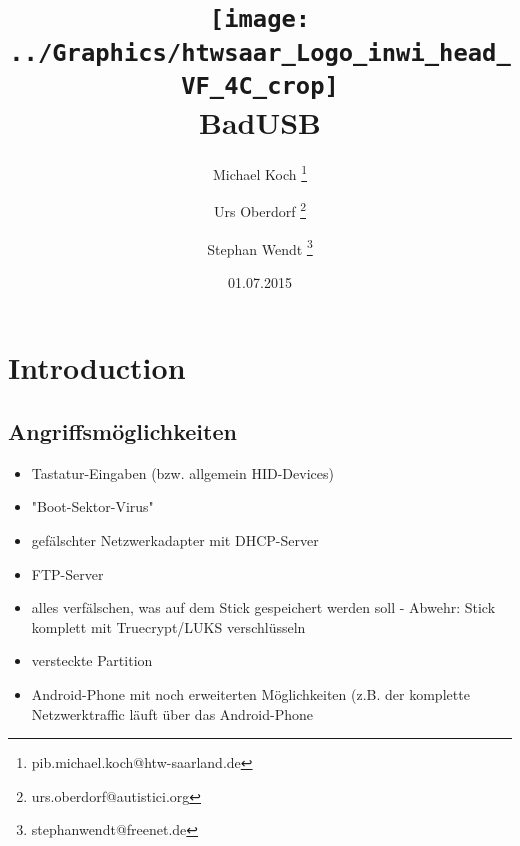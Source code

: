 \documentclass[
a4paper, %
twoside%
]{article}
\title{\texttt{[image: ../Graphics/htwsaar\_Logo\_inwi\_head\_VF\_4C\_crop]}\\ BadUSB}
\author{Michael Koch
\thanks{pib.michael.koch@htw-saarland.de}
\and{Urs Oberdorf}
\thanks{urs.oberdorf@autistici.org}
\and{Stephan Wendt}
\thanks{stephanwendt@freenet.de}}
\date{01.07.2015}
\begin{document}

\maketitle





\section{Introduction}
\subsection{Angriffsmöglichkeiten}
\begin{itemize}
\item Tastatur-Eingaben (bzw. allgemein HID-Devices)
\item "Boot-Sektor-Virus"
\item gefälschter Netzwerkadapter mit DHCP-Server
\item FTP-Server
\item alles verfälschen, was auf dem Stick gespeichert werden soll - Abwehr: Stick komplett mit Truecrypt/LUKS verschlüsseln
\item versteckte Partition
\item Android-Phone mit noch erweiterten Möglichkeiten (z.B. der komplette
	Netzwerktraffic läuft über das Android-Phone
\end{itemize}
\end{document}
